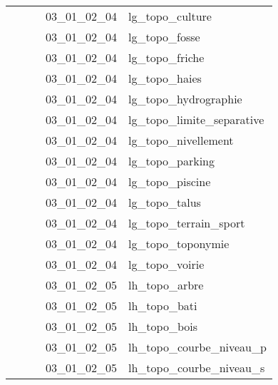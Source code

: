 \documentclass[12pt,titlepage]{book}
\begin{document}
\begin{supertabular}{|p{7.5cm}|p{7.5cm}|p{7.5cm}|c|p{10cm}|}
                   &                    &                    & 03\_01\_02\_04 & lg\_topo\_culture\\
                   &                    &                    & 03\_01\_02\_04 & lg\_topo\_fosse\\
                   &                    &                    & 03\_01\_02\_04 & lg\_topo\_friche\\
                   &                    &                    & 03\_01\_02\_04 & lg\_topo\_haies\\
                   &                    &                    & 03\_01\_02\_04 & lg\_topo\_hydrographie\\
                   &                    &                    & 03\_01\_02\_04 & lg\_topo\_limite\_separative\\
                   &                    &                    & 03\_01\_02\_04 & lg\_topo\_nivellement\\
                   &                    &                    & 03\_01\_02\_04 & lg\_topo\_parking\\
                   &                    &                    & 03\_01\_02\_04 & lg\_topo\_piscine\\
                   &                    &                    & 03\_01\_02\_04 & lg\_topo\_talus\\
                   &                    &                    & 03\_01\_02\_04 & lg\_topo\_terrain\_sport\\
                   &                    &                    & 03\_01\_02\_04 & lg\_topo\_toponymie\\
                   &                    &                    & 03\_01\_02\_04 & lg\_topo\_voirie\\
                   &                    &                    & 03\_01\_02\_05 & lh\_topo\_arbre\\
                   &                    &                    & 03\_01\_02\_05 & lh\_topo\_bati\\
                   &                    &                    & 03\_01\_02\_05 & lh\_topo\_bois\\
                   &                    &                    & 03\_01\_02\_05 & lh\_topo\_courbe\_niveau\_p\\
                   &                    &                    & 03\_01\_02\_05 & lh\_topo\_courbe\_niveau\_s\\

\end{supertabular}
\end{document}
